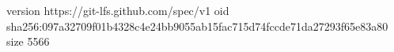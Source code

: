 version https://git-lfs.github.com/spec/v1
oid sha256:097a32709f01b4328c4e24bb9055ab15fac715d74fccde71da27293f65e83a80
size 5566
